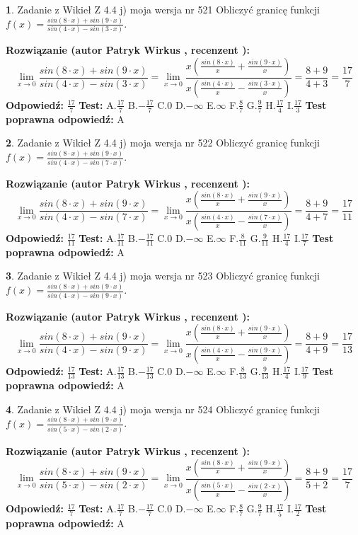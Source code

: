 \documentclass[12pt, a4paper]{article}
\theoremstyle{definition} %
\newtheorem{zad}{}
\newcommand{\zadStart}[1]{\begin{zad}#1\newline}
\newcommand{\zadStop}{\end{zad}}
\newcommand{\rozwStart}[2]{\noindent \textbf{Rozwiązanie (autor #1 , recenzent #2): }\newline}
\newcommand{\rozwStop}{\newline}
\newcommand{\odpStart}{\noindent \textbf{Odpowiedź:}\newline}
\newcommand{\odpStop}{\newline}
\newcommand{\testStart}{\noindent \textbf{Test:}\newline}
\newcommand{\testStop}{\newline}
\newcommand{\kluczStart}{\noindent \textbf{Test poprawna odpowiedź:}\newline}
\newcommand{\kluczStop}{\newline}
\begin{document}
\zadStart{Zadanie z Wikieł Z 4.4 j) moja wersja nr 521}
Obliczyć granicę funkcji $f(x)=\frac{sin(8\cdot x) +sin(9\cdot x)}{sin(4\cdot x) -sin(3\cdot x)}$.
\zadStop
\rozwStart{Patryk Wirkus}{}
$$\lim\limits_{x\to 0}\frac{sin(8\cdot x) +sin(9\cdot x)}{sin(4\cdot x) -sin(3\cdot x)}=\lim\limits_{x\to 0}\frac{x(\frac{sin(8\cdot x)}{x}+\frac{sin(9\cdot x)}{x})}{x(\frac{sin(4\cdot x)}{x}-\frac{sin(3\cdot x)}{x})}=\frac{8+9}{4+3} = \frac{17}{7}$$
\rozwStop
\odpStart
$\frac{17}{7}$
\odpStop
\testStart
A.$\frac{17}{7}$
B.$-\frac{17}{7}$
C.$0$
D.$-\infty$
E.$\infty$
F.$\frac{8}{7}$
G.$\frac{9}{7}$
H.$\frac{17}{4}$
I.$\frac{17}{3}$
\testStop
\kluczStart
A
\kluczStop



\zadStart{Zadanie z Wikieł Z 4.4 j) moja wersja nr 522}
Obliczyć granicę funkcji $f(x)=\frac{sin(8\cdot x) +sin(9\cdot x)}{sin(4\cdot x) -sin(7\cdot x)}$.
\zadStop
\rozwStart{Patryk Wirkus}{}
$$\lim\limits_{x\to 0}\frac{sin(8\cdot x) +sin(9\cdot x)}{sin(4\cdot x) -sin(7\cdot x)}=\lim\limits_{x\to 0}\frac{x(\frac{sin(8\cdot x)}{x}+\frac{sin(9\cdot x)}{x})}{x(\frac{sin(4\cdot x)}{x}-\frac{sin(7\cdot x)}{x})}=\frac{8+9}{4+7} = \frac{17}{11}$$
\rozwStop
\odpStart
$\frac{17}{11}$
\odpStop
\testStart
A.$\frac{17}{11}$
B.$-\frac{17}{11}$
C.$0$
D.$-\infty$
E.$\infty$
F.$\frac{8}{11}$
G.$\frac{9}{11}$
H.$\frac{17}{4}$
I.$\frac{17}{7}$
\testStop
\kluczStart
A
\kluczStop



\zadStart{Zadanie z Wikieł Z 4.4 j) moja wersja nr 523}
Obliczyć granicę funkcji $f(x)=\frac{sin(8\cdot x) +sin(9\cdot x)}{sin(4\cdot x) -sin(9\cdot x)}$.
\zadStop
\rozwStart{Patryk Wirkus}{}
$$\lim\limits_{x\to 0}\frac{sin(8\cdot x) +sin(9\cdot x)}{sin(4\cdot x) -sin(9\cdot x)}=\lim\limits_{x\to 0}\frac{x(\frac{sin(8\cdot x)}{x}+\frac{sin(9\cdot x)}{x})}{x(\frac{sin(4\cdot x)}{x}-\frac{sin(9\cdot x)}{x})}=\frac{8+9}{4+9} = \frac{17}{13}$$
\rozwStop
\odpStart
$\frac{17}{13}$
\odpStop
\testStart
A.$\frac{17}{13}$
B.$-\frac{17}{13}$
C.$0$
D.$-\infty$
E.$\infty$
F.$\frac{8}{13}$
G.$\frac{9}{13}$
H.$\frac{17}{4}$
I.$\frac{17}{9}$
\testStop
\kluczStart
A
\kluczStop



\zadStart{Zadanie z Wikieł Z 4.4 j) moja wersja nr 524}
Obliczyć granicę funkcji $f(x)=\frac{sin(8\cdot x) +sin(9\cdot x)}{sin(5\cdot x) -sin(2\cdot x)}$.
\zadStop
\rozwStart{Patryk Wirkus}{}
$$\lim\limits_{x\to 0}\frac{sin(8\cdot x) +sin(9\cdot x)}{sin(5\cdot x) -sin(2\cdot x)}=\lim\limits_{x\to 0}\frac{x(\frac{sin(8\cdot x)}{x}+\frac{sin(9\cdot x)}{x})}{x(\frac{sin(5\cdot x)}{x}-\frac{sin(2\cdot x)}{x})}=\frac{8+9}{5+2} = \frac{17}{7}$$
\rozwStop
\odpStart
$\frac{17}{7}$
\odpStop
\testStart
A.$\frac{17}{7}$
B.$-\frac{17}{7}$
C.$0$
D.$-\infty$
E.$\infty$
F.$\frac{8}{7}$
G.$\frac{9}{7}$
H.$\frac{17}{5}$
I.$\frac{17}{2}$
\testStop
\kluczStart
A
\kluczStop
\end{document}
